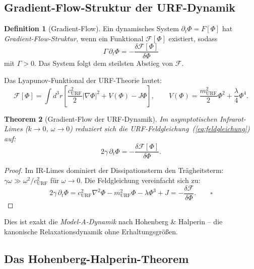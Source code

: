 \documentclass[12pt,a4paper]{article}
\newtheorem{theorem}{Theorem}[section]
\theoremstyle{definition}
\newtheorem{definition}[theorem]{Definition}
\begin{document}
\subsection{Gradient-Flow-Struktur der URF-Dynamik}

\begin{definition}[Gradient-Flow]
Ein dynamisches System $\partial_t\Phi = F[\Phi]$ hat
\emph{Gradient-Flow-Struktur}, wenn ein Funktional $\mathcal{F}[\Phi]$
existiert, sodass
\begin{equation}
  \Gamma\,\partial_t\Phi = -\frac{\delta\mathcal{F}[\Phi]}{\delta\Phi}
\end{equation}
mit $\Gamma > 0$. Das System folgt dem steilsten Abstieg von
$\mathcal{F}$.
\end{definition}

Das Lyapunov-Funktional der URF-Theorie lautet:
\begin{equation}
  \mathcal{F}[\Phi] = \int d^3r \left[
    \frac{c_{\mathrm{URF}}^2}{2}|\nabla\Phi|^2
    + V(\Phi) - J\Phi
  \right],
  \qquad V(\Phi) = \frac{m_{\mathrm{URF}}^2}{2}\Phi^2
  + \frac{\lambda}{4}\Phi^4.
\end{equation}

\begin{theorem}[Gradient-Flow der URF-Dynamik]
Im asymptotischen Infrarot-Limes ($k \to 0$, $\omega \to 0$) reduziert
sich die URF-Feldgleichung~(\ref{eq:feldgleichung}) auf:
\begin{equation}
  2\gamma\,\partial_t\Phi = -\frac{\delta\mathcal{F}[\Phi]}{\delta\Phi}.
  \label{eq:gradientflow}
\end{equation}
\end{theorem}

\begin{proof}
Im IR-Limes dominiert der Dissipationsterm den Trägheitsterm:
$\gamma\omega \gg \omega^2/c_{\mathrm{URF}}^2$ für $\omega \to 0$.
Die Feldgleichung vereinfacht sich zu:
\begin{equation}
  2\gamma\,\partial_t\Phi = c_{\mathrm{URF}}^2\nabla^2\Phi
  - m_{\mathrm{URF}}^2\Phi - \lambda\Phi^3 + J
  = -\frac{\delta\mathcal{F}}{\delta\Phi}. \qquad \square
\end{equation}
\end{proof}

\noindent
Dies ist exakt die \emph{Model-A-Dynamik} nach Hohenberg \&
Halperin \cite{Hohenberg1977} -- die kanonische Relaxationsdynamik
ohne Erhaltungsgrößen.

\subsection{Das Hohenberg-Halperin-Theorem}
\end{document}
